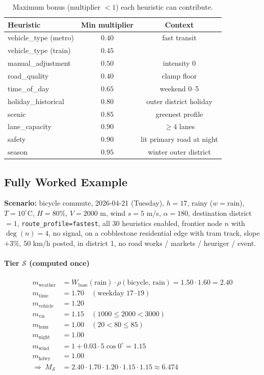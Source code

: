 \documentclass[12pt,a4paper]{article}
\begin{document}
\begin{table}[H]
\centering\small
\caption{Maximum bonus (multiplier $<1$) each heuristic can contribute.}
\begin{tabular}{lcc}
\toprule
Heuristic & Min multiplier & Context \\\midrule
vehicle\_type (metro) & $0.40$ & fast transit \\
vehicle\_type (train) & $0.45$ & \\
manual\_adjustment    & $0.50$ & intensity 0 \\
road\_quality         & $0.40$ & clamp floor \\
time\_of\_day         & $0.65$ & weekend 0–5 \\
holiday\_historical   & $0.80$ & outer district holiday \\
scenic                & $0.85$ & greenest profile \\
lane\_capacity        & $0.90$ & $\ge 4$ lanes \\
safety                & $0.90$ & lit primary road at night \\
season                & $0.95$ & winter outer district \\\bottomrule
\end{tabular}
\end{table}

\subsection{Fully Worked Example}

\textbf{Scenario:} bicycle commute, 2026-04-21 (Tuesday), $h=17$, rainy ($w=\text{rain}$), $T=10^\circ$C, $H=80\%$, $V=2000$ m, wind $s=5$ m/s, $\alpha=180$, destination district $=1$, \texttt{route\_profile=fastest}, all 30 heuristics enabled, frontier node $n$ with $\deg(n)=4$, no signal, on a cobblestone residential edge with tram track, slope $+3\%$, 50 km/h posted, in district 1, no road works / markets / heuriger / event.

\paragraph{Tier $\mathcal{S}$ (computed once)}
\begin{align*}
m_{\text{weather}} &= W_{\text{base}}(\text{rain})\cdot \rho(\text{bicycle, rain}) = 1.50 \cdot 1.60 = 2.40 \\
m_{\text{time}}    &= 1.70 \quad (\text{weekday 17–19}) \\
m_{\text{vehicle}} &= 1.20 \\
m_{\text{vis}}     &= 1.15 \quad (1000\le 2000<3000) \\
m_{\text{hum}}     &= 1.00 \quad (20<80\le 85) \\
m_{\text{night}}   &= 1.00 \\
m_{\text{wind}}    &= 1 + 0.03\cdot 5\cos 0^\circ = 1.15 \\
m_{\text{hdwy}}    &= 1.00 \\[2pt]
\Rightarrow\ M_{\mathcal{S}} &= 2.40\cdot 1.70\cdot 1.20\cdot 1.15\cdot 1.15 \approx 6.474
\end{align*}
\end{document}
